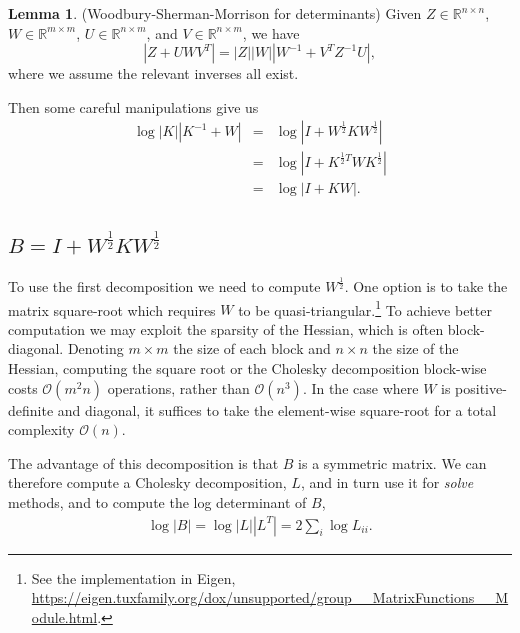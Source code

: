 \documentclass[stslayout, noinfoline]{imsart}
\theoremstyle{definition}
\newtheorem{lemma}{Lemma}
\begin{document}
\begin{lemma} 
(Woodbury-Sherman-Morrison for determinants)
  Given $Z \in \mathbb R^{n \times n}$, $W \in \mathbb R^{m \times m}$, $U \in \mathbb R^{n \times m}$, and $V \in \mathbb R^{n \times m}$,
we have
  \begin{equation*}
    |Z + UWV^T| = |Z| |W| |W^{-1} + V^TZ^{-1}U|,
  \end{equation*}
  where we assume the relevant inverses all exist.
\end{lemma}
%
Then some careful manipulations give us
%
\begin{eqnarray}
  \log |K| |K^{-1} + W| & = & \log |I + W^\frac{1}{2} K W^\frac{1}{2}| \nonumber \\
    & = & \log |I + K^{\frac{1}{2} T} W K^\frac{1}{2}| \nonumber \\
    & = & \log |I + KW|.
\end{eqnarray}

\subsection{$B = I + W^\frac{1}{2} K W^\frac{1}{2}$}

To use the first decomposition we need to compute $W^\frac{1}{2}$.
One option is to take the matrix square-root which requires $W$ to be 
quasi-triangular.\footnote{See the implementation in Eigen, \url{https://eigen.tuxfamily.org/dox/unsupported/group\_\_MatrixFunctions\_\_Module.html}.}
To achieve better computation we may exploit the sparsity of the Hessian, which is often block-diagonal.
Denoting $m \times m$ the size of each block and $n \times n$ the size of the Hessian,
computing the square root or the Cholesky decomposition block-wise costs $\mathcal O(m^2 n)$ operations, rather than $\mathcal O(n^3)$.
In the case where $W$ is positive-definite and diagonal, it suffices to take the element-wise square-root for a total complexity $\mathcal O(n)$.

The advantage of this decomposition is that $B$ is a symmetric matrix.
We can therefore compute a Cholesky decomposition, $L$,
and in turn use it for \textit{solve} methods, and to compute the log determinant of $B$,
\begin{eqnarray*}
  \log |B| = \log |L| |L^T| = 2 \sum_i \log L_{ii}.
\end{eqnarray*}
\end{document}
